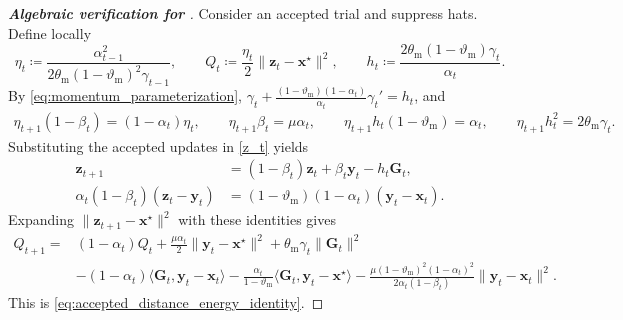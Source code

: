 \documentclass{article}
\begin{document}
\begin{proof}[\textbf{Algebraic verification for }]
Consider an accepted trial and suppress hats.
\label{proof:energy_algebra}%
Define locally
\[
\eta_t\coloneqq
\frac{\alpha_{t-1}^2}
{2\theta_{\mathrm{m}}(1-\vartheta_{\mathrm{m}})^2\gamma_{t-1}},
\qquad
Q_t\coloneqq\frac{\eta_t}{2}\|\bm{z}_t-\bm{x}^\star\|^2,
\qquad
h_t\coloneqq\frac{2\theta_{\mathrm{m}}(1-\vartheta_{\mathrm{m}})\gamma_t}{\alpha_t}.
\]
By \eqref{eq:momentum_parameterization},
\(\gamma_t+\frac{(1-\vartheta_{\mathrm{m}})(1-\alpha_t)}{\alpha_t}\gamma_t'=h_t\),
and
\[
\begin{aligned}
\eta_{t+1}(1-\beta_t)=(1-\alpha_t)\eta_t,
\qquad
\eta_{t+1}\beta_t=\mu\alpha_t,\qquad
\eta_{t+1}h_t(1-\vartheta_{\mathrm{m}})={\alpha_t},
\qquad
{\eta_{t+1}h_t^2}=2\theta_{\mathrm{m}}\gamma_t.
\end{aligned}
\]
Substituting the accepted updates in \eqref{z_t} yields
\[
\begin{aligned}
\bm{z}_{t+1}&=(1-\beta_t)\bm{z}_t+\beta_t\bm{y}_t-h_t\mathbf{G}_t,
\\
\alpha_t(1-\beta_t)(\bm{z}_t-\bm{y}_t)
&={(1-\vartheta_{\mathrm{m}})(1-\alpha_t)}
(\bm{y}_t-\bm{x}_t).
\end{aligned}
\]
Expanding \(\|\bm{z}_{t+1}-\bm{x}^\star\|^2\) with these identities gives
\begin{align*}
Q_{t+1}
={}&(1-\alpha_t)Q_t
+\frac{\mu\alpha_t}{2}\|\bm{y}_t-\bm{x}^\star\|^2
+\theta_{\mathrm{m}}\gamma_t\|\mathbf{G}_t\|^2\\
&-(1-\alpha_t)\langle\mathbf{G}_t,\bm{y}_t-\bm{x}_t\rangle
-\frac{\alpha_t}{1-\vartheta_{\mathrm{m}}}
\langle\mathbf{G}_t,\bm{y}_t-\bm{x}^\star\rangle-\frac{\mu(1-\vartheta_{\mathrm{m}})^2(1-\alpha_t)^2}
{2\alpha_t(1-\beta_t)}\|\bm{y}_t-\bm{x}_t\|^2.
\end{align*}
This is \eqref{eq:accepted_distance_energy_identity}.
\end{proof}
\end{document}
